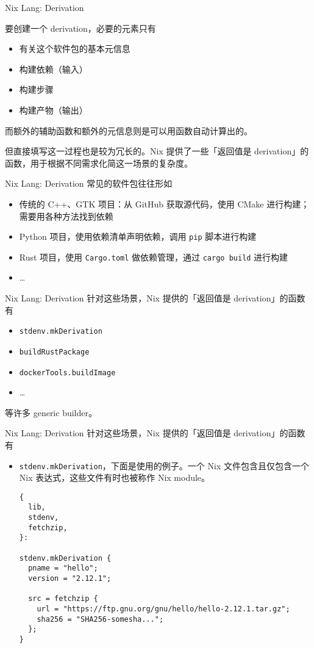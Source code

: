 \documentclass{beamer}
\begin{document}
\begin{frame}{Nix Lang: Derivation}

要创建一个 derivation，必要的元素只有

\begin{itemize}
  \item 有关这个软件包的基本元信息
  \item 构建依赖（输入）
  \item 构建步骤
  \item 构建产物（输出）
\end{itemize}

而额外的辅助函数和额外的元信息则是可以用函数自动计算出的。

但直接填写这一过程也是较为冗长的。Nix 提供了一些「返回值是 derivation」的函数，用于根据不同需求化简这一场景的复杂度。
\end{frame}

\begin{frame}{Nix Lang: Derivation}
常见的软件包往往形如
\begin{itemize}
    \item 传统的 C++、GTK 项目：从 GitHub 获取源代码，使用 CMake 进行构建；需要用各种方法找到依赖
    \item Python 项目，使用依赖清单声明依赖，调用 {\tt pip} 脚本进行构建
    \item Rust 项目，使用 {\tt Cargo.toml} 做依赖管理，通过 {\tt cargo build} 进行构建
    \item \ldots
\end{itemize}
\end{frame}

\begin{frame}[fragile]{Nix Lang: Derivation}
针对这些场景，Nix 提供的「返回值是 derivation」的函数有
\begin{itemize}
    \item {\tt stdenv.mkDerivation}
    \item {\tt buildRustPackage}
    \item {\tt dockerTools.buildImage}
    \item \ldots
\end{itemize}
等许多 generic builder。
\end{frame}

\begin{frame}[fragile]{Nix Lang: Derivation}
针对这些场景，Nix 提供的「返回值是 derivation」的函数有
\begin{itemize}
    \item {\tt stdenv.mkDerivation}，下面是使用的例子。一个 Nix 文件包含且仅包含一个 Nix 表达式，这些文件有时也被称作 Nix module。

\begin{verbatim}
{
  lib,
  stdenv,
  fetchzip,
}:

stdenv.mkDerivation {
  pname = "hello";
  version = "2.12.1";

  src = fetchzip {
    url = "https://ftp.gnu.org/gnu/hello/hello-2.12.1.tar.gz";
    sha256 = "SHA256-somesha...";
  };
}
        \end{verbatim}
\end{itemize}
\end{frame}
\end{document}
